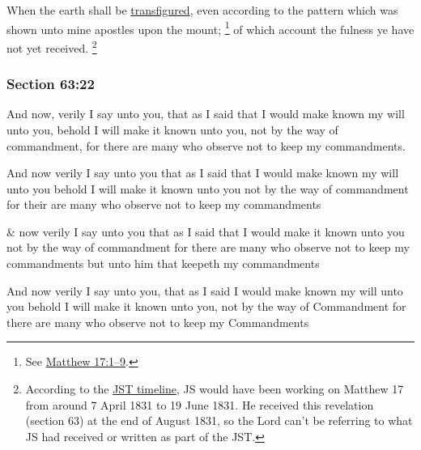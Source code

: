 		When the earth shall be \hyperref[TRANSFIGURATION]{transfigured}, even according to the pattern which was shown unto mine apostles upon the mount;%
			\footnote{%
				See \hyperref[MATTHEW-17-1]{Matthew 17:1--9}.
				}
		of which account the fulness ye have not yet received.%
			\footnote{%
				According to the \hyperref[JST-TIMELINE]{JST timeline}, JS would have been working on Matthew 17 from around 7 April 1831 to 19 June 1831. He received this revelation (section 63) at the end of August 1831, so the Lord can't be referring to what JS had received or written as part of the JST.
				}


	\subsubsection{Section 63:22} %
		\label{DC63-22}

		And now, verily I say unto you, that as I said that I would make known my will unto you, behold I will make it known unto you, not by the way of commandment, for there are many who observe not to keep my commandments.

		\begin{framed}
		\scriptsize
			\begin{compactdesc}
				\item[JSP] And now verily I say unto you that as I said that I would make known my will unto you behold I will make it known unto you not by the way of commandment for their are many who observe not to keep my commandments
				\item[RB1] \& now verily I say unto you that as I said that I would make it known unto you not by the way of commandment for there are many who observe not to keep my commandments but unto him that keepeth my commandments
				\item[Gilbert] And now verily I say unto you, that as I said I would make known my will unto you behold I will make it known unto you, not by the way of Commandment for there are many who observe not to keep my Commandments
			\end{compactdesc}
		\end{framed}

